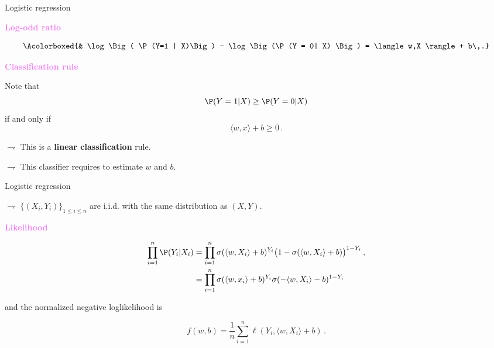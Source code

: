 \documentclass[xcolor={usenames,dvipsnames}]{beamer}
\begin{document}
\begin{frame}{Logistic regression}

{\bf\textcolor{violet}{Log-odd ratio}}

\begin{align*}
\Acolorboxed{&
\log \Big( \P(Y=1 | X)\Big) - \log \Big(\P(Y = 0| X) \Big) 
= \langle w,X \rangle  + b\,.}
\end{align*}

\vspace{.3cm}

{\bf\textcolor{violet}{Classification rule}}

 Note that 
\begin{equation*}
\P(Y = 1| X) \geq \P(Y = 0| X)
\end{equation*}
if and only if
\begin{equation*}
\langle w,x \rangle + b \geqslant 0\,.
\end{equation*}

$\rightharpoondown$ This is a \textbf{\alert{linear classification}} rule.

$\rightharpoondown$ This classifier requires to \alert{estimate $w$ and $b$}.

\end{frame}

\begin{frame}{Logistic regression}

$\rightharpoondown$   $\{(X_i,Y_i)\}_{1\leqslant i\leqslant n}$ are \alert{i.i.d. with the same distribution as $(X,Y)$}.

{\bf\textcolor{violet}{Likelihood}}

\begin{align*}
 \prod_{i=1}^n \P(Y_i | X_i) &= \prod_{i=1}^n \sigma(\langle w,X_i \rangle + b)^{Y_i} \big(1 - 
\sigma(\langle w,X_i \rangle + b) \big)^{1 - Y_i}\,, \\
& = \prod_{i=1}^n \sigma(\langle w,x_i \rangle + b)^{Y_i} 
\sigma(-\langle w,X_i \rangle - b)^{1 - Y_i}
\end{align*}
\smallskip

and the \alert{normalized negative loglikelihood} is 
\smallskip

\begin{equation*}
f(w,b) = \frac{1}{n}\sum_{i=1}^n \ell(Y_i, \langle w,X_i \rangle + b)\,.
\end{equation*}
\end{frame}
\end{document}
